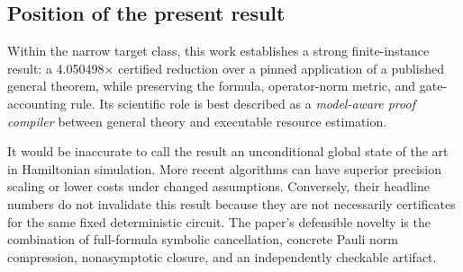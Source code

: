 \subsection{Position of the present result}

Within the narrow target class, this work establishes a strong finite-instance
result: a 4.050498$\times$ certified reduction over a pinned application of a
published general theorem, while preserving the formula, operator-norm metric,
and gate-accounting rule.  Its scientific role is best described as a
\emph{model-aware proof compiler} between general theory and executable
resource estimation.

It would be inaccurate to call the result an unconditional global state of the
art in Hamiltonian simulation.  More recent algorithms can have superior
precision scaling or lower costs under changed assumptions.  Conversely,
their headline numbers do not invalidate this result because they are not
necessarily certificates for the same fixed deterministic circuit.  The
paper's defensible novelty is the combination of full-formula symbolic
cancellation, concrete Pauli norm compression, nonasymptotic closure, and an
independently checkable artifact.
